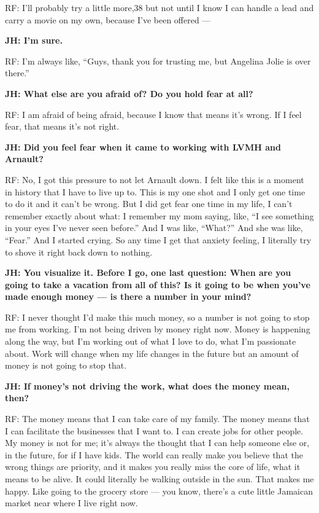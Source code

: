 RF: I'll probably try a little more,38 but not until I know I can handle
a lead and carry a movie on my own, because I've been offered ---

\textbf{JH: I'm sure.}

RF: I'm always like, ``Guys, thank you for trusting me, but Angelina
Jolie is over there.''

\textbf{JH: What else are you afraid of? Do you hold fear at all?}

RF: I am afraid of being afraid, because I know that means it's wrong.
If I feel fear, that means it's not right.

\textbf{JH: Did you feel fear when it came to working with LVMH and
Arnault?}

RF: No, I got this pressure to not let Arnault down. I felt like this is
a moment in history that I have to live up to. This is my one shot and I
only get one time to do it and it can't be wrong. But I did get fear one
time in my life, I can't remember exactly about what: I remember my mom
saying, like, ``I see something in your eyes I've never seen before.''
And I was like, ``What?'' And she was like, ``Fear.'' And I started
crying. So any time I get that anxiety feeling, I literally try to shove
it right back down to nothing.

\textbf{JH: You visualize it. Before I go, one last question: When are
you going to take a vacation from all of this? Is it going to be when
you've made enough money --- is there a number in your mind?}

RF: I never thought I'd make this much money, so a number is not going
to stop me from working. I'm not being driven by money right now. Money
is happening along the way, but I'm working out of what I love to do,
what I'm passionate about. Work will change when my life changes in the
future but an amount of money is not going to stop that.

\textbf{JH: If money's not driving the work, what does the money mean,
then?}

RF: The money means that I can take care of my family. The money means
that I can facilitate the businesses that I want to. I can create jobs
for other people. My money is not for me; it's always the thought that I
can help someone else or, in the future, for if I have kids. The world
can really make you believe that the wrong things are priority, and it
makes you really miss the core of life, what it means to be alive. It
could literally be walking outside in the sun. That makes me happy. Like
going to the grocery store --- you know, there's a cute little Jamaican
market near where I live right now.

